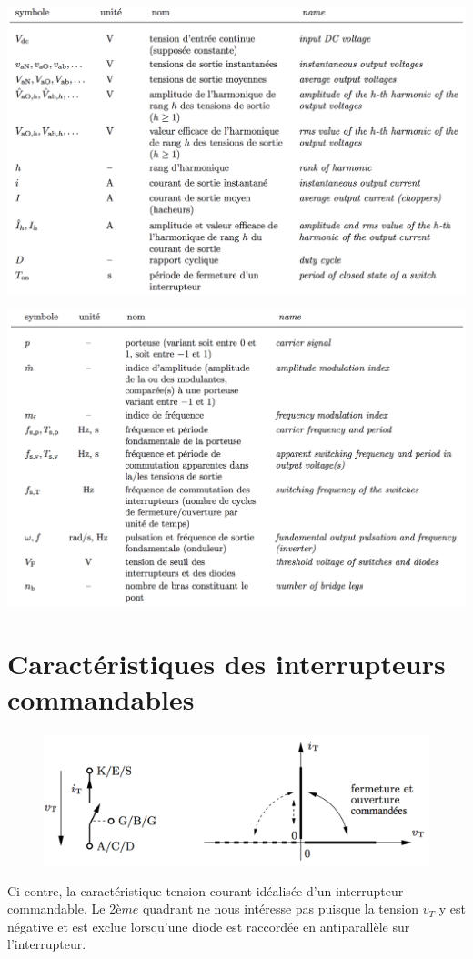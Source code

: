 	\begin{minipage}{0.5\textwidth}
		\includegraphics[scale=0.25]{ch4/2}
	\end{minipage}
	\begin{minipage}{0.5\textwidth}
		\vspace{3mm}
		\includegraphics[scale=0.25]{ch4/3}	
	\end{minipage}
	
\section{Caractéristiques des interrupteurs commandables}
	\begin{figure}
	\vspace{-5mm}
	\includegraphics[scale=0.25]{ch4/4}
	\end{figure}
	Ci-contre, la caractéristique tension-courant idéalisée d'un interrupteur commandable. Le 2${ème}$ quadrant ne nous intéresse pas puisque la tension $v_T$ y est négative et est exclue lorsqu'une diode est raccordée en antiparallèle sur l'interrupteur. \\
	
